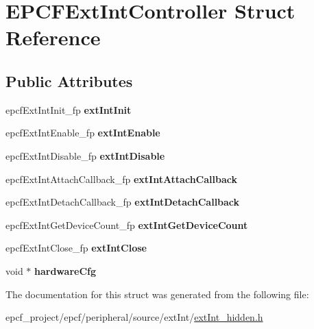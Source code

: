 \hypertarget{structEPCFExtIntController}{}\section{E\+P\+C\+F\+Ext\+Int\+Controller Struct Reference}
\label{structEPCFExtIntController}
\subsection*{Public Attributes}
\begin{DoxyCompactItemize}
\item 
\mbox{\label{structEPCFExtIntController_a09c0e2f751021e1c54ac76df5edbcf99}} 
epcf\+Ext\+Int\+Init\+\_\+fp {\bfseries ext\+Int\+Init}
\item 
\mbox{\label{structEPCFExtIntController_a56ca65873e91e294b3e66bc86c562661}} 
epcf\+Ext\+Int\+Enable\+\_\+fp {\bfseries ext\+Int\+Enable}
\item 
\mbox{\label{structEPCFExtIntController_a2279e3a54e3737c353cfafb5865f9002}} 
epcf\+Ext\+Int\+Disable\+\_\+fp {\bfseries ext\+Int\+Disable}
\item 
\mbox{\label{structEPCFExtIntController_a765592a2aa21e08b2f2950019c6e673f}} 
epcf\+Ext\+Int\+Attach\+Callback\+\_\+fp {\bfseries ext\+Int\+Attach\+Callback}
\item 
\mbox{\label{structEPCFExtIntController_acae8fc04a9e64a27c4f242892e960b49}} 
epcf\+Ext\+Int\+Detach\+Callback\+\_\+fp {\bfseries ext\+Int\+Detach\+Callback}
\item 
\mbox{\label{structEPCFExtIntController_a14f3a35817915acf23c8abad7d3ed7dd}} 
epcf\+Ext\+Int\+Get\+Device\+Count\+\_\+fp {\bfseries ext\+Int\+Get\+Device\+Count}
\item 
\mbox{\label{structEPCFExtIntController_a4dde89145b9437b41624b791683638a1}} 
epcf\+Ext\+Int\+Close\+\_\+fp {\bfseries ext\+Int\+Close}
\item 
\mbox{\label{structEPCFExtIntController_a1a0810f380215a63b3885666dcf8f30a}} 
void $\ast$ {\bfseries hardware\+Cfg}
\end{DoxyCompactItemize}


The documentation for this struct was generated from the following file\+:\begin{DoxyCompactItemize}
\item 
epcf\+\_\+project/epcf/peripheral/source/ext\+Int/\mbox{\hyperlink{extInt__hidden_8h}{ext\+Int\+\_\+hidden.\+h}}\end{DoxyCompactItemize}
